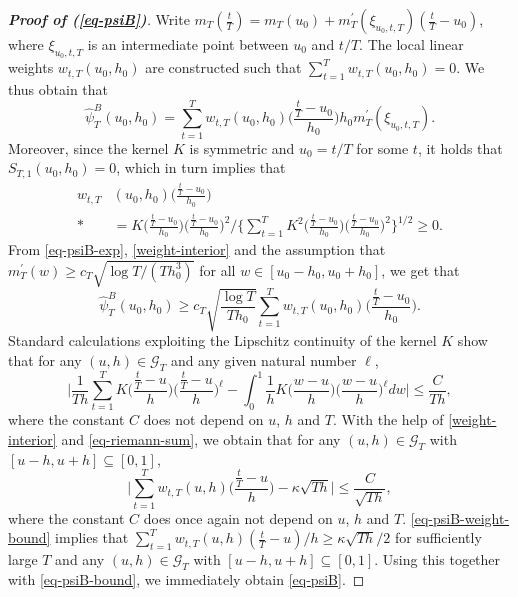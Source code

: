 \begin{proof}[\textnormal{\textbf{Proof of (\ref{eq-psiB})}}] 
Write $m_T(\frac{t}{T}) = m_T(u_0) + m_T^\prime(\xi_{u_0,t,T})(\frac{t}{T} - u_0)$, where $\xi_{u_0,t,T}$ is an intermediate point between $u_0$ and $t/T$. The local linear weights $w_{t,T}(u_0,h_0)$ are constructed such that $\sum_{t=1}^T w_{t,T}(u_0,h_0) = 0$. We thus obtain that 
\begin{equation}\label{eq-psiB-exp}
\widehat{\psi}_T^B(u_0,h_0) = \sum\limits_{t=1}^T w_{t,T}(u_0,h_0) \Big(\frac{\frac{t}{T} - u_0}{h_0}\Big) h_0 m_T^\prime(\xi_{u_0,t,T}).
\end{equation}
Moreover, since the kernel $K$ is symmetric and $u_0 = t/T$ for some $t$, it holds that $S_{T,1}(u_0,h_0) = 0$, which in turn implies that 
\begin{align}
w_{t,T} & (u_0,h_0) \Big( \frac{\frac{t}{T} - u_0}{h_0} \Big) \nonumber \\* & = K\Big(\frac{\frac{t}{T}-u_0}{h_0}\Big) \Big( \frac{\frac{t}{T} - u_0}{h_0} \Big)^2 \Big/ \Big\{ \sum_{t=1}^T K^2\Big(\frac{\frac{t}{T}-u_0}{h_0}\Big) \Big( \frac{\frac{t}{T} - u_0}{h_0} \Big)^2 \Big\}^{1/2} \ge 0. \label{weight-interior} 
\end{align}
From \eqref{eq-psiB-exp}, \eqref{weight-interior} and the assumption that $m_T^\prime(w) \ge c_T \sqrt{\log T/(Th_0^3)}$ for all $w \in [u_0-h_0,u_0+h_0]$, we get that 
\begin{equation}\label{eq-psiB-bound}
\widehat{\psi}_T^B(u_0,h_0) \ge c_T \sqrt{\frac{\log T}{T h_0}} \sum\limits_{t=1}^T w_{t,T}(u_0,h_0) \Big( \frac{\frac{t}{T} - u_0}{h_0} \Big).  
\end{equation}
Standard calculations exploiting the Lipschitz continuity of the kernel $K$ show that for any $(u,h) \in \mathcal{G}_T$ and any given natural number $\ell$, 
\begin{equation}\label{eq-riemann-sum}
\Big| \frac{1}{Th} \sum\limits_{t=1}^T K\Big(\frac{\frac{t}{T}-u}{h}\Big) \Big(\frac{\frac{t}{T}-u}{h}\Big)^\ell - \int_0^1 \frac{1}{h} K\Big(\frac{w-u}{h}\Big) \Big(\frac{w-u}{h}\Big)^\ell dw \Big| \le \frac{C}{Th}, 
\end{equation}
where the constant $C$ does not depend on $u$, $h$ and $T$. With the help of \eqref{weight-interior} and \eqref{eq-riemann-sum}, we obtain that for any $(u,h) \in \mathcal{G}_T$ with $[u-h,u+h] \subseteq [0,1]$, 
\begin{equation}\label{eq-psiB-weight-bound}
\Big| \sum\limits_{t=1}^T w_{t,T}(u,h) \Big(\frac{\frac{t}{T} - u}{h}\Big) - \kappa \sqrt{Th} \Big| \le \frac{C}{\sqrt{Th}}, 
\end{equation}
where the constant $C$ does once again not depend on $u$, $h$ and $T$. \eqref{eq-psiB-weight-bound} implies that $\sum\nolimits_{t=1}^T w_{t,T}(u,h) (\frac{t}{T} - u)/h \ge \kappa \sqrt{Th} / 2$ for sufficiently large $T$ and any $(u,h) \in \mathcal{G}_T$ with $[u-h,u+h] \subseteq [0,1]$. Using this together with \eqref{eq-psiB-bound}, we immediately obtain \eqref{eq-psiB}.
\end{proof}



